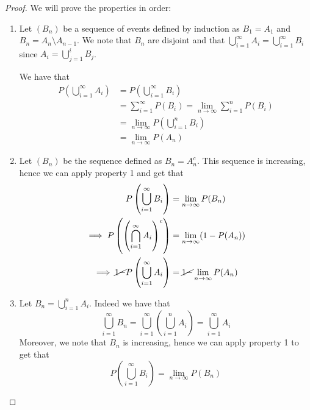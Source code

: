 \documentclass[10pt]{extarticle}
\begin{document}
\begin{proof}
    We will prove the properties in order:
    \begin{enumerate}
        \item Let $(B_n)$ be a sequence of events defined by induction as $B_1 = A_1$ and $B_n = A_n \setminus A_{n-1}$.
              We note that $B_n$ are disjoint
              and that $\bigcup_{i=1}^\infty A_i = \bigcup_{i=1}^\infty B_i$
              since $A_i = \bigcup_{j=1}^i B_j$.

              We have that
              \begin{align*}
                  P\left(\bigcup_{i=1}^\infty A_i\right) & = P\left(\bigcup_{i=1}^\infty B_i\right)                             \\
                                                         & = \sum_{i=1}^\infty P(B_i) = \lim_{n \to \infty} \sum_{i=1}^n P(B_i) \\
                                                         & = \lim_{n \to \infty} P\left(\bigcup_{i=1}^n B_i\right)              \\
                                                         & = \lim_{n \to \infty} P(A_n)
              \end{align*}
        \item Let $(B_n)$ be the sequence defined as $B_n = A_n^c$.
              This sequence is increasing, hence we can apply property 1 and get that
              \begin{align*}
                  P\left(\bigcup_{i=1}^\infty B_i\right)                         & = \lim_{n \to \infty} P(B_n)              \\
                  \implies P\left(\left(\bigcap_{i=1}^\infty A_i\right)^c\right) & = \lim_{n \to \infty} (1-P(A_n))          \\
                  \implies \cancel{1 -} P\left(\bigcup_{i=1}^\infty A_i\right)   & = \cancel{1 -} \lim_{n \to \infty} P(A_n) \\
              \end{align*}
        \item Let $B_n = \bigcup_{i=1}^n A_i$.
              Indeed we have that
              \[
                  \bigcup_{i=1}^\infty B_n =
                  \bigcup_{i=1}^\infty \left( \bigcup_{i=1}^n A_i \right) =
                  \bigcup_{i=1}^\infty A_i
                  \tag{*}
              \]
              Moreover, we note that $B_n$ is increasing, hence we can apply property 1 to get that
              $$
                  P\left(\bigcup_{i=1}^\infty B_i\right) = \lim_{n \to \infty} P(B_n)
              $$


\end{enumerate}
\end{proof}
\end{document}
